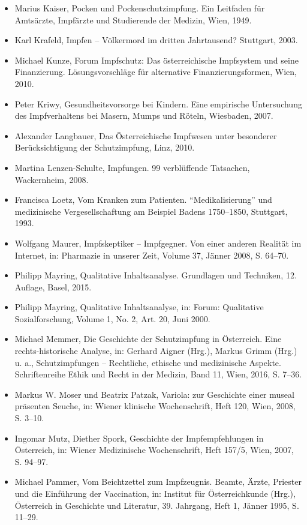 \documentclass[
    a4paper,
    12pt,
    hyphens,
    chapterprefix=true,
    headheight=33pt,
    footheight=29pt,
    headings=optiontohead,
]{scrartcl}
\begin{document}
{\begin{itemize}
\item{Marius Kaiser, Pocken und Pockenschutzimpfung. Ein Leitfaden für Amtsärzte, Impfärzte und Studierende der Medizin, Wien, 1949.}
\item{Karl Krafeld, Impfen -- Völkermord im dritten Jahrtausend? Stuttgart, 2003.}
\item{Michael Kunze, Forum Impfschutz: Das österreichische Impfsystem und seine Finanzierung. Lösungsvorschläge für alternative Finanzierungsformen, Wien, 2010.}
\item{Peter Kriwy, Gesundheitsvorsorge bei Kindern. Eine empirische Untersuchung des Impfverhaltens bei Masern, Mumps und Röteln, Wiesbaden, 2007.}
\item{Alexander Langbauer, Das Österreichische Impfwesen unter besonderer Berücksichtigung der Schutzimpfung, Linz, 2010.}
\item{Martina Lenzen-Schulte, Impfungen. 99 verblüffende Tatsachen, Wackernheim, 2008.}
\item{Francisca Loetz, Vom Kranken zum Patienten. "`Medikalisierung"' und medizinische Vergesellschaftung am Beispiel Badens 1750--1850, Stuttgart, 1993.}
\item{Wolfgang Maurer, Impfskeptiker -- Impfgegner. Von einer anderen Realität im Internet, in: Pharmazie in unserer Zeit, Volume 37, Jänner 2008, S. 64--70.}
\item{Philipp Mayring, Qualitative Inhaltsanalyse. Grundlagen und Techniken, 12. Auflage, Basel, 2015.}
\item{Philipp Mayring, Qualitative Inhaltsanalyse, in: Forum: Qualitative Sozialforschung, Volume 1, No. 2, Art. 20, Juni 2000.}
\item{Michael Memmer, Die Geschichte der Schutzimpfung in Österreich. Eine rechts-historische Analyse, in: Gerhard Aigner (Hrg.), Markus Grimm (Hrg.) u. a., Schutzimpfungen -- Rechtliche, ethische und medizinische Aspekte. Schriftenreihe Ethik und Recht in der Medizin, Band 11, Wien, 2016, S. 7--36.}
\item{Markus W. Moser und Beatrix Patzak, Variola: zur Geschichte einer museal präsenten Seuche, in: Wiener klinische Wochenschrift, Heft 120, Wien, 2008, S. 3--10.}
\item{Ingomar Mutz, Diether Spork, Geschichte der Impfempfehlungen in Österreich, in: Wiener Medizinische Wochenschrift, Heft 157/5, Wien, 2007, S. 94--97.}
\item{Michael Pammer, Vom Beichtzettel zum Impfzeugnis. Beamte, Ärzte, Priester und die Einführung der Vaccination, in: Institut für Österreichkunde (Hrg.), Österreich in Geschichte und Literatur, 39. Jahrgang, Heft 1, Jänner 1995, S. 11--29.}

\end{itemize}}
\end{document}
